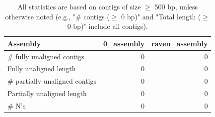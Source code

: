 \documentclass[12pt,a4paper]{article}
\begin{document}
\begin{table}[ht]
\begin{center}
\caption{All statistics are based on contigs of size $\geq$ 500 bp, unless otherwise noted (e.g., "\# contigs ($\geq$ 0 bp)" and "Total length ($\geq$ 0 bp)" include all contigs).}
\begin{tabular}{|l*{2}{|r}|}
\hline
Assembly & 0\_assembly & raven\_assembly \\ \hline
\# fully unaligned contigs & 0 & 0 \\ \hline
Fully unaligned length & 0 & 0 \\ \hline
\# partially unaligned contigs & 0 & 0 \\ \hline
Partially unaligned length & 0 & 0 \\ \hline
\# N's & 0 & 0 \\ \hline
\end{tabular}
\end{center}
\end{table}
\end{document}
